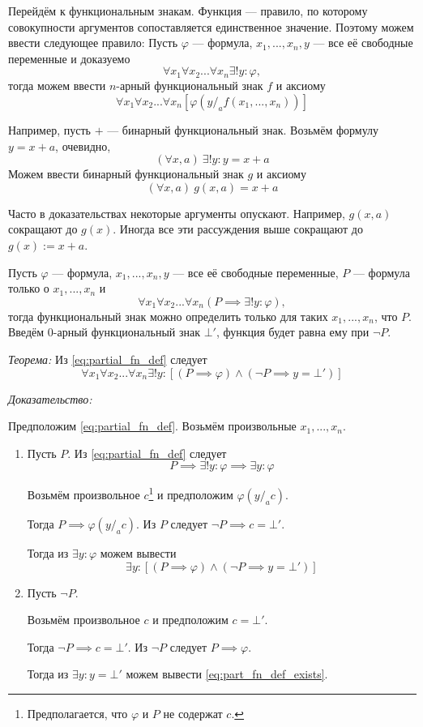 Перейдём к функциональным знакам. Функция --- правило, по которому совокупности
аргументов сопоставляется единственное значение. Поэтому можем ввести следующее
правило: Пусть $\varphi$ --- формула, $x_1,...,x_{n},y$ --- все её свободные переменные
и доказуемо
\[
	\forall x_1\forall x_2...\forall x_{n}\exists !y:\varphi,
\]
тогда можем ввести $n$-арный функциональный знак $f$ и аксиому
\[
	\forall x_1\forall x_2...\forall x_{n} [\varphi(y/_{a}f(x_1,...,x_{n}))]
\]

Например, пусть $+$ --- бинарный функциональный знак. Возьмём формулу $y=x+a$, очевидно,
\[
	(\forall x,a)~\exists !y:y=x+a
\]
Можем ввести бинарный функциональный знак $g$ и аксиому
\[
	(\forall x,a)~g(x,a)=x+a
\]

Часто в доказательствах некоторые аргументы опускают.
Например, $g(x,a)$ сокращают до $g(x)$.
Иногда все эти рассуждения выше сокращают до $g(x):=x+a$.

Пусть $\varphi$ --- формула, $x_1,...,x_{n},y$ --- все её
свободные переменные, $P$ --- формула только о $x_1,...,x_{n}$ и
\begin{equation}\label{eq:partial_fn_def}
	\forall x_1\forall x_2...\forall x_{n}(P\implies \exists!y:\varphi),
\end{equation}
тогда функциональный знак можно определить только для
таких $x_1,...,x_{n}$, что $P$. Введём $0$-арный функциональный знак $\bot'$,
функция будет равна ему при $\lnot P$.

	{\it Теорема:} Из \eqref{eq:partial_fn_def} следует
\[
	\forall x_1\forall x_2...\forall x_{n}\exists !y:
	[(P\implies\varphi)\land(\lnot P\implies y=\bot')]
\]

{\it Доказательство:}

Предположим \eqref{eq:partial_fn_def}.
Возьмём произвольные $x_1,...,x_{n}$.

\begin{enumerate}
	\item{}Пусть $P$. Из \eqref{eq:partial_fn_def} следует
	\[
		P\implies \exists !y:\varphi\implies \exists y:\varphi
	\]

	Возьмём произвольное $c$\footnote{
		Предполагается, что $\varphi$ и $P$ не содержат $c$.
	} и предположим $\varphi(y/_{a}c)$.

	Тогда $P\implies\varphi(y/_{a}c)$. Из $P$ следует $\lnot P\implies c=\bot'$.

	Тогда из $\exists y:\varphi$ можем вывести
	\begin{equation}\label{eq:part_fn_def_exists}
		\exists y:[(P\implies\varphi)\land(\lnot P\implies y=\bot')]
	\end{equation}

	\item{}Пусть $\lnot P$.

	Возьмём произвольное $c$ и предположим $c=\bot'$.

	Тогда $\lnot P\implies c=\bot'$.
	Из $\lnot P$ следует $P\implies \varphi$.

	Тогда из $\exists y:y=\bot'$ можем вывести \eqref{eq:part_fn_def_exists}.
\end{enumerate}

